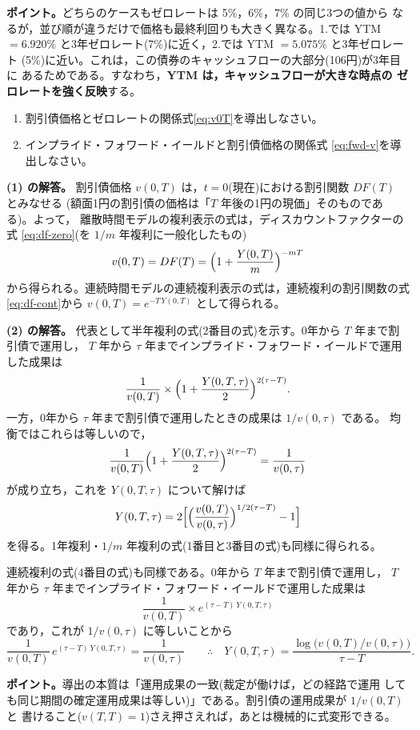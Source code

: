 \begin{answerbox}
\medskip
\textbf{ポイント。}どちらのケースもゼロレートは 5\%，6\%，7\% の同じ3つの値から
なるが，並び順が違うだけで価格も最終利回りも大きく異なる。1.では YTM
$=6.920\%$ と3年ゼロレート(7\%)に近く，2.では YTM $=5.075\%$ と3年ゼロレート
(5\%)に近い。これは，この債券のキャッシュフローの大部分(106円)が3年目に
あるためである。すなわち，\textbf{YTM は，キャッシュフローが大きな時点の
ゼロレートを強く反映}する。
\end{answerbox}

\begin{exercise}[問題3-4：割引債価格との関係]
\begin{enumerate}
\item[(1)] 割引債価格とゼロレートの関係式\eqref{eq:v0T}を導出しなさい。
\item[(2)] インプライド・フォワード・イールドと割引債価格の関係式
\eqref{eq:fwd-v}を導出しなさい。
\end{enumerate}
\end{exercise}

\begin{answerbox}
\textbf{(1) の解答。}
割引債価格 $v(0,T)$ は，$t=0$(現在)における割引関数 $DF(T)$ とみなせる
(額面1円の割引債の価格は「$T$ 年後の1円の現価」そのものである)。よって，
離散時間モデルの複利表示の式は，ディスカウントファクターの式
\eqref{eq:df-zero}(を $1/m$ 年複利に一般化したもの)
\[
v(0,T) = DF(T) = \Bigl(1+\frac{Y(0,T)}{m}\Bigr)^{-mT}
\]
から得られる。連続時間モデルの連続複利表示の式は，連続複利の割引関数の式
\eqref{eq:df-cont}から $v(0,T) = e^{-T\,Y(0,T)}$ として得られる。

\medskip
\textbf{(2) の解答。}
代表として半年複利の式(2番目の式)を示す。0年から $T$ 年まで割引債で運用し，
$T$ 年から $\tau$ 年までインプライド・フォワード・イールドで運用した成果は
\[
\frac{1}{v(0,T)}\times\Bigl(1+\frac{Y(0,T,\tau)}{2}\Bigr)^{2(\tau-T)}.
\]
一方，0年から $\tau$ 年まで割引債で運用したときの成果は $1/v(0,\tau)$ である。
均衡ではこれらは等しいので，
\[
\frac{1}{v(0,T)}\Bigl(1+\frac{Y(0,T,\tau)}{2}\Bigr)^{2(\tau-T)}
= \frac{1}{v(0,\tau)}
\]
が成り立ち，これを $Y(0,T,\tau)$ について解けば
\[
Y(0,T,\tau) = 2\Bigl[\Bigl(\frac{v(0,T)}{v(0,\tau)}\Bigr)^{1/2(\tau-T)} - 1\Bigr]
\]
を得る。1年複利・$1/m$ 年複利の式(1番目と3番目の式)も同様に得られる。

連続複利の式(4番目の式)も同様である。0年から $T$ 年まで割引債で運用し，
$T$ 年から $\tau$ 年までインプライド・フォワード・イールドで運用した成果は
\[
\frac{1}{v(0,T)}\times e^{(\tau-T)\,Y(0,T,\tau)}
\]
であり，これが $1/v(0,\tau)$ に等しいことから
\[
\frac{1}{v(0,T)}\,e^{(\tau-T)\,Y(0,T,\tau)} = \frac{1}{v(0,\tau)}
\qquad\therefore\quad
Y(0,T,\tau) = \frac{\log\bigl(v(0,T)/v(0,\tau)\bigr)}{\tau-T}.
\]

\medskip
\textbf{ポイント。}導出の本質は「運用成果の一致(裁定が働けば，どの経路で運用
しても同じ期間の確定運用成果は等しい)」である。割引債の運用成果が $1/v(0,T)$ と
書けること($v(T,T)=1$)さえ押さえれば，あとは機械的に式変形できる。
\end{answerbox}
